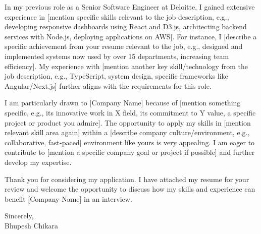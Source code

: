 \documentclass[letterpaper,11pt]{article}
\begin{document}
\begin{raggedright}
In my previous role as a Senior Software Engineer at Deloitte, I gained extensive experience in [mention specific skills relevant to the job description, e.g., developing responsive dashboards using React and D3.js, architecting backend services with Node.js, deploying applications on AWS]. For instance, I [describe a specific achievement from your resume relevant to the job, e.g., designed and implemented systems now used by over 15 departments, increasing team efficiency]. My experience with [mention another key skill/technology from the job description, e.g., TypeScript, system design, specific frameworks like Angular/Next.js] further aligns with the requirements for this role.
\vspace{1\baselineskip}
\end{raggedright}

\begin{raggedright}
I am particularly drawn to [Company Name] because of [mention something specific, e.g., its innovative work in X field, its commitment to Y value, a specific project or product you admire]. The opportunity to apply my skills in [mention relevant skill area again] within a [describe company culture/environment, e.g., collaborative, fast-paced] environment like yours is very appealing. I am eager to contribute to [mention a specific company goal or project if possible] and further develop my expertise.
\vspace{1\baselineskip}
\end{raggedright}

\begin{raggedright}
Thank you for considering my application. I have attached my resume for your review and welcome the opportunity to discuss how my skills and experience can benefit [Company Name] in an interview.
\vspace{2\baselineskip} %
\end{raggedright}

\begin{raggedright}
Sincerely, \\
\vspace{3\baselineskip} %
Bhupesh Chikara
\end{raggedright}
\end{document}
